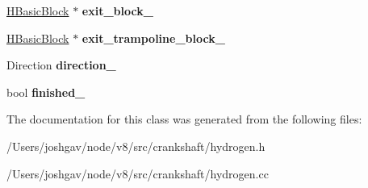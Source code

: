 \begin{DoxyCompactItemize}
\item 
\hyperlink{classv8_1_1internal_1_1_h_basic_block}{H\+Basic\+Block} $\ast$ {\bfseries exit\+\_\+block\+\_\+}\hypertarget{classv8_1_1internal_1_1_h_graph_builder_1_1_loop_builder_a44cbcfab6b4e34e4b685419a161bedcb}{}\label{classv8_1_1internal_1_1_h_graph_builder_1_1_loop_builder_a44cbcfab6b4e34e4b685419a161bedcb}

\item 
\hyperlink{classv8_1_1internal_1_1_h_basic_block}{H\+Basic\+Block} $\ast$ {\bfseries exit\+\_\+trampoline\+\_\+block\+\_\+}\hypertarget{classv8_1_1internal_1_1_h_graph_builder_1_1_loop_builder_a3d86f19e8997d10bd0811e3d7a85bbf6}{}\label{classv8_1_1internal_1_1_h_graph_builder_1_1_loop_builder_a3d86f19e8997d10bd0811e3d7a85bbf6}

\item 
Direction {\bfseries direction\+\_\+}\hypertarget{classv8_1_1internal_1_1_h_graph_builder_1_1_loop_builder_a9ea02bf8480e81ccf6c5d83afca480dc}{}\label{classv8_1_1internal_1_1_h_graph_builder_1_1_loop_builder_a9ea02bf8480e81ccf6c5d83afca480dc}

\item 
bool {\bfseries finished\+\_\+}\hypertarget{classv8_1_1internal_1_1_h_graph_builder_1_1_loop_builder_a672bc9e450ad8282c780616861f4f240}{}\label{classv8_1_1internal_1_1_h_graph_builder_1_1_loop_builder_a672bc9e450ad8282c780616861f4f240}

\end{DoxyCompactItemize}


The documentation for this class was generated from the following files\+:\begin{DoxyCompactItemize}
\item 
/\+Users/joshgav/node/v8/src/crankshaft/hydrogen.\+h\item 
/\+Users/joshgav/node/v8/src/crankshaft/hydrogen.\+cc\end{DoxyCompactItemize}

